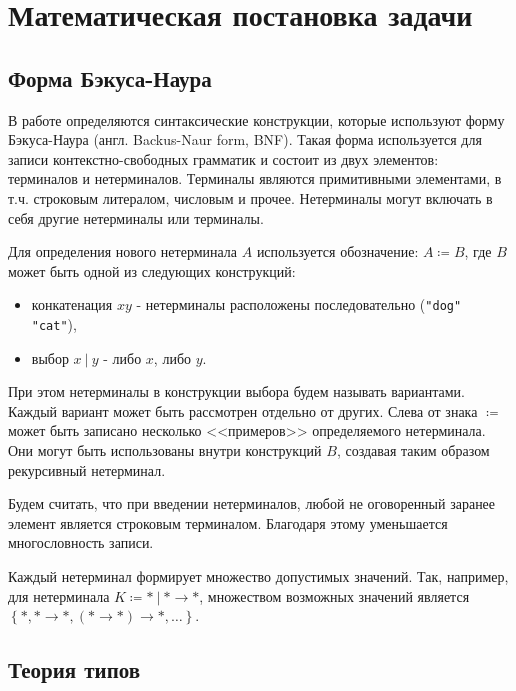 \chapter{Математическая постановка задачи}
\label{ch:math}


\section{Форма Бэкуса-Наура}
\label{sec:bnf}


В работе определяются синтаксические конструкции, которые используют форму Бэкуса-Наура (англ. Backus-Naur form, BNF).
Такая форма используется для записи контекстно-свободных грамматик и состоит из двух элементов: терминалов и нетерминалов.
Терминалы являются примитивными элементами, в т.ч. строковым литералом, числовым и прочее.
Нетерминалы могут включать в себя другие нетерминалы или терминалы.

Для определения нового нетерминала $A$ используется обозначение: $A \coloneqq B$, где $B$ может быть одной из следующих конструкций:
\begin{itemize}
    \item конкатенация $x y$ - нетерминалы расположены последовательно (\lstinline{"dog"  "cat"}),
    \item выбор $x ~|~ y$ - либо $x$, либо $y$.
\end{itemize}
При этом нетерминалы в конструкции выбора будем называть вариантами.
Каждый вариант может быть рассмотрен отдельно от других.
Слева от знака $\coloneqq$ может быть записано несколько <<примеров>> определяемого нетерминала.
Они могут быть использованы внутри конструкций $B$, создавая таким образом рекурсивный нетерминал.

Будем считать, что при введении нетерминалов, любой не оговоренный заранее элемент является строковым терминалом.
Благодаря этому уменьшается многословность записи.

Каждый нетерминал формирует множество допустимых значений.
Так, например, для нетерминала $K \coloneqq * ~|~ * \to *$, множеством возможных значений является $\left\{ *, * \to *, (* \to *) \to *, \ldots \right\}$.

\section{Теория типов}
\label{sec:type_theory}

